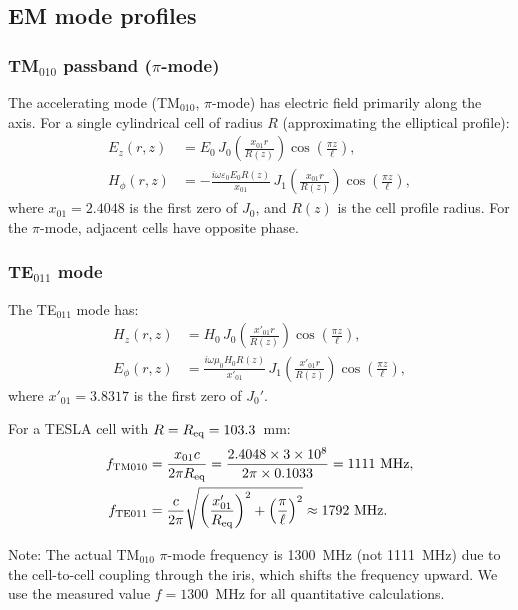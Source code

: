 \documentclass[12pt,aps,prd,twocolumn,superscriptaddress,nofootinbib]{revtex4-2}
\begin{document}
\subsection{EM mode profiles}

\subsubsection{TM$_{010}$ passband ($\pi$-mode)}

The accelerating mode (TM$_{010}$, $\pi$-mode) has electric field
primarily along the axis.  For a single cylindrical cell of radius
$R$ (approximating the elliptical profile):
\begin{align}
E_z(r,z) &= E_0\,J_0\!\left(\frac{x_{01}r}{R(z)}\right)
\cos\!\left(\frac{\pi z}{\ell}\right),
\label{eq:TM010_Ez}\\
H_\phi(r,z) &= -\frac{i\omega\varepsilon_0 E_0 R(z)}{x_{01}}\,
J_1\!\left(\frac{x_{01}r}{R(z)}\right)
\cos\!\left(\frac{\pi z}{\ell}\right),
\label{eq:TM010_Hphi}
\end{align}
where $x_{01} = 2.4048$ is the first zero of $J_0$, and $R(z)$ is
the cell profile radius.  For the $\pi$-mode, adjacent cells have
opposite phase.

\subsubsection{TE$_{011}$ mode}

The TE$_{011}$ mode has:
\begin{align}
H_z(r,z) &= H_0\,J_0\!\left(\frac{x'_{01}r}{R(z)}\right)
\cos\!\left(\frac{\pi z}{\ell}\right),
\label{eq:TE011_Hz}\\
E_\phi(r,z) &= \frac{i\omega\mu_0 H_0 R(z)}{x'_{01}}\,
J_1\!\left(\frac{x'_{01}r}{R(z)}\right)
\cos\!\left(\frac{\pi z}{\ell}\right),
\label{eq:TE011_Ephi}
\end{align}
where $x'_{01} = 3.8317$ is the first zero of $J_0'$.

For a TESLA cell with $R = R_{\rm eq} = 103.3$~mm:
\begin{align}
f_{{\rm TM}010} &= \frac{x_{01}c}{2\pi R_{\rm eq}}
= \frac{2.4048\times3\times10^8}{2\pi\times0.1033}
= 1111~{\rm MHz},
\label{eq:f_TM}\\
f_{{\rm TE}011} &= \frac{c}{2\pi}\sqrt{\left(\frac{x'_{01}}{R_{\rm eq}}
\right)^2 + \left(\frac{\pi}{\ell}\right)^2}
\approx 1792~{\rm MHz}.
\label{eq:f_TE}
\end{align}

Note: The actual TM$_{010}$ $\pi$-mode frequency is 1300~MHz
(not 1111~MHz) due to the cell-to-cell coupling through the iris,
which shifts the frequency upward.  We use the measured value
$f = 1300$~MHz for all quantitative calculations.
\end{document}
